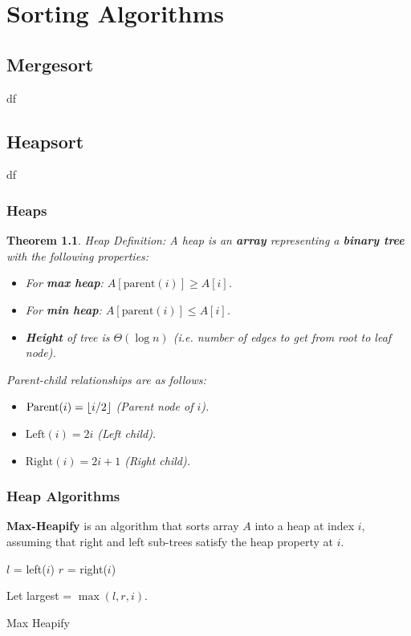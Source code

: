 \documentclass[a4paper,12pt]{report}
\newtheorem{theorem}{Theorem}
\DeclarePairedDelimiter{\floor}{\lfloor}{\rfloor}
\begin{document}
\chapter{Sorting Algorithms}

\section{Mergesort}
df

\section{Heapsort}
df
\subsection{Heaps}

\begin{theorem}{Heap Definition:}
A heap is an \textbf{array} representing a \textbf{binary tree} with the following properties:
\begin{itemize}
\item For \textbf{max heap}: $A[\text{parent}(i)] \geq A[i]$.
\item For \textbf{min heap}: $A[\text{parent}(i)] \leq A[i]$.
\item \textbf{Height} of tree is $\Theta(\log n)$ \textit{(i.e. number of edges to get from root to leaf node)}. 
\end{itemize}

Parent-child relationships are as follows:
\begin{itemize}
\item $\text{Parent}(i) = \floor{i/2}$ (Parent node of $i$).
\item $\text{Left}(i) = 2i$ (Left child).
\item $\text{Right}(i) = 2i+1$ (Right child).
\end{itemize}
\end{theorem}

\subsection{Heap Algorithms}

\textbf{Max-Heapify} is an algorithm that sorts array $A$ into a heap at index $i$, assuming that right and left sub-trees satisfy the heap property at $i$. 

\begin{algorithm}[H]
\SetAlgoLined
{}
    \BlankLine
    \BlankLine
    $l$ = left($i$)\;
    $r$ = right($i$)\;

    Let largest = $\max(l,r,i)$.
    
    \caption{Max Heapify}
\end{algorithm}
\end{document}
